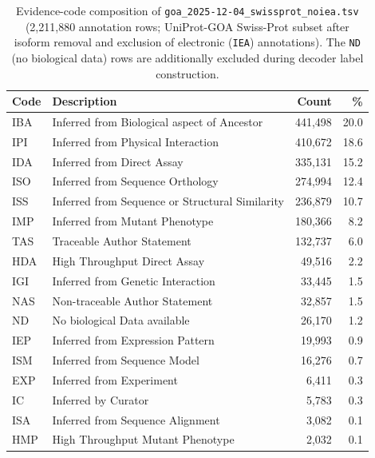\documentclass[11pt,a4paper]{article}
\begin{document}
\begin{table}[H]
\centering
\scriptsize
\setlength{\tabcolsep}{4pt}
\renewcommand{\arraystretch}{1.0}
\caption{Evidence-code composition of \texttt{goa\_2025-12-04\_swissprot\_noiea.tsv} (2{,}211{,}880 annotation rows; UniProt-GOA Swiss-Prot subset after isoform removal and exclusion of electronic (\texttt{IEA}) annotations). The \texttt{ND} (no biological data) rows are additionally excluded during decoder label construction.}
\label{tab:goa-evidence-codes}
\begin{tabular}{@{}llrr@{}}
\toprule
\textbf{Code} & \textbf{Description} & \textbf{Count} & \textbf{\%} \\
\midrule
IBA & Inferred from Biological aspect of Ancestor    & 441{,}498 & 20.0 \\
IPI & Inferred from Physical Interaction              & 410{,}672 & 18.6 \\
IDA & Inferred from Direct Assay                      & 335{,}131 & 15.2 \\
ISO & Inferred from Sequence Orthology                & 274{,}994 & 12.4 \\
ISS & Inferred from Sequence or Structural Similarity & 236{,}879 & 10.7 \\
IMP & Inferred from Mutant Phenotype                  & 180{,}366 &  8.2 \\
TAS & Traceable Author Statement                      & 132{,}737 &  6.0 \\
HDA & High Throughput Direct Assay                    &  49{,}516 &  2.2 \\
IGI & Inferred from Genetic Interaction                &  33{,}445 &  1.5 \\
NAS & Non-traceable Author Statement                  &  32{,}857 &  1.5 \\
ND  & No biological Data available                    &  26{,}170 &  1.2 \\
IEP & Inferred from Expression Pattern                &  19{,}993 &  0.9 \\
ISM & Inferred from Sequence Model                    &  16{,}276 &  0.7 \\
EXP & Inferred from Experiment                        &   6{,}411 &  0.3 \\
IC  & Inferred by Curator                             &   5{,}783 &  0.3 \\
ISA & Inferred from Sequence Alignment                &   3{,}082 &  0.1 \\
HMP & High Throughput Mutant Phenotype                &   2{,}032 &  0.1 \\

\end{tabular}
\end{table}
\end{document}
